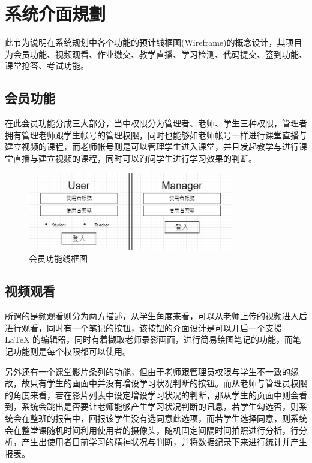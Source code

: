 \section{系统介面規劃}

此节为说明在系统规划中各个功能的预计线框图(Wireframe)的概念设计，其项目为会员功能、视频观看、作业缴交、教学直播、学习检测、代码提交、签到功能、课堂抢答、考试功能。

\subsection{会员功能}

在此会员功能分成三大部分，当中权限分为管理者、老师、学生三种权限，管理者拥有管理老师跟学生帐号的管理权限，同时也能够如老师帐号一样进行课堂直播与建立视频的课程，而老师帐号则是可以管理学生进入课堂，并且发起教学与进行课堂直播与建立视频的课程，同时可以询问学生进行学习效果的判断。

\begin{figure}[htb]
\centering 
\includegraphics[width=0.80\textwidth]{img/ch1m4.png} 
\caption{会员功能线框图}
\label{Test}
\end{figure}

\subsection{视频观看}

所谓的是频观看则分为两方描述，从学生角度来看，可以从老师上传的视频进入后进行观看，同时有一个笔记的按钮，该按钮的介面设计是可以开启一个支援 LaTeX 的编辑器，同时有着撷取老师录影画面，进行简易绘图笔记的功能，而笔记功能则是每个权限都可以使用。

另外还有一个课堂影片条列的功能，但由于老师跟管理员权限与学生不一致的缘故，故只有学生的画面中并没有增设学习状况判断的按钮。而从老师与管理员权限的角度来看，若在影片列表中设定增设学习状况的判断，那从学生的页面中则会看到，系统会跳出是否要让老师能够产生学习状况判断的讯息，若学生勾选否，则系统会在整班的报告中，回报该学生没有选同意此选项，而若学生选择同意，则系统会在整堂课随机时间利用使用者的摄像头，随机固定间隔时间拍照进行分析，行分析，产生出使用者目前学习的精神状况与判断，并将数据纪录下来进行统计并产生报表。

